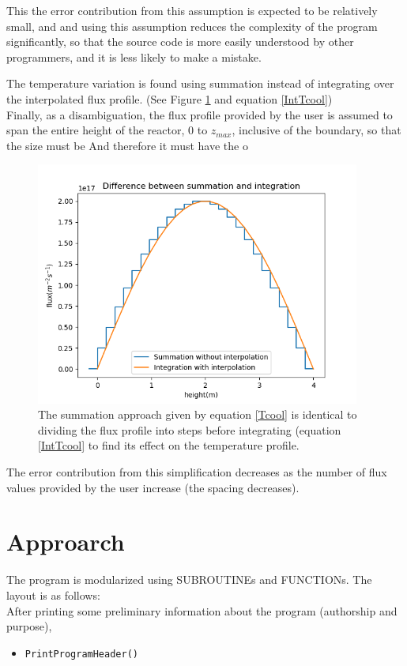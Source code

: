 \documentclass[a4paper, 12pt]{article}
\begin{document}
This the error contribution from this assumption is expected to be relatively small, and and using this assumption reduces the complexity of the program significantly, so that the source code is more easily understood by other programmers, and it is less likely to make a mistake.

The temperature variation is found using summation instead of integrating over the interpolated flux profile. (See Figure \ref{OnlyPicture} and equation \ref{IntTcool})\\

Finally, as a disambiguation, the flux profile provided by the user is assumed to span the entire height of the reactor, 0 to $z_{max}$, inclusive of the boundary, so that the size must be 
And therefore it must have the o	
\begin{figure}[!h]
\centering
\includegraphics[height=8cm]{SumVsInt.png}
\caption{The summation approach given by equation \ref{Tcool} is identical to dividing the flux profile into steps before integrating (equation \ref{IntTcool} to find its effect on the temperature profile.}\label{OnlyPicture}
\end{figure}

The error contribution from this simplification decreases as the number of flux values provided by the user increase (the spacing decreases).

\section{Approarch}
The program is modularized using \textcolor{subr}{SUBROUTINE}s and \textcolor{func}{FUNCTION}s. The layout is as follows:\\

After printing some preliminary information about the program (authorship and purpose),
\begin{itemize}
	\item \texttt{\textcolor{subr}{PrintProgramHeader}()}
\end{itemize}
\end{document}
